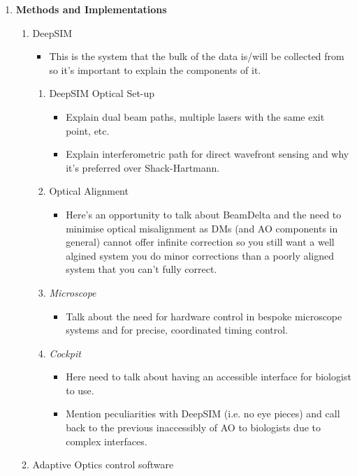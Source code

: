 \documentclass[twoside,onecolumn]{article}
\begin{document}
\begin{enumerate}[label*=\arabic*.]
	\item \textbf{Methods and Implementations}
	\begin{enumerate}[label*=\arabic*.]
		\item DeepSIM
		\begin{itemize}
			\item This is the system that the bulk of the data is/will be collected from so it's important to explain the components of it.
		\end{itemize}
		\begin{enumerate}[label*=\arabic*.]
			\item DeepSIM Optical Set-up
			\begin{itemize}
				\item Explain dual beam paths, multiple lasers with the same exit point, etc.
				\item Explain interferometric path for direct wavefront sensing and why it's preferred over Shack-Hartmann.
			\end{itemize}
			\item Optical Alignment
			\begin{itemize}
				\item Here's an opportunity to talk about BeamDelta and the need to minimise optical misalignment as DMs (and  AO components in general) cannot offer infinite correction so you still want a well algined system you do minor corrections than a poorly aligned system that you can't fully correct.
			\end{itemize}
			\item \textit{Microscope}
			\begin{itemize}
				\item Talk about the need for hardware control in bespoke microscope systems and for precise, coordinated timing control.
			\end{itemize}
			\item \textit{Cockpit}
			\begin{itemize}
				\item Here need to talk about having an accessible interface for biologist to use.
				\item Mention peculiarities with DeepSIM (i.e. no eye pieces) and call back to the previous inaccessibly of AO to biologists due to complex interfaces.
			\end{itemize}
		\end{enumerate}
		\item Adaptive Optics control software
		\begin{itemize}

\end{itemize}
\end{enumerate}
\end{enumerate}
\end{document}
